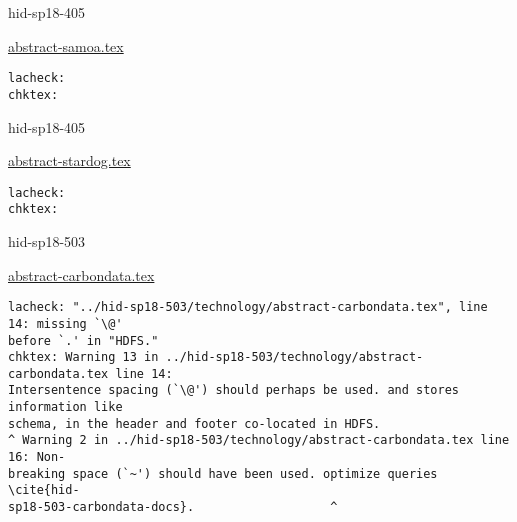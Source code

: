 \begin{IU}

hid-sp18-405

\href{https://github.com/cloudmesh-community/hid-sp18-405/blob/master//technology/abstract-samoa.tex}{abstract-samoa.tex}

\begin{tiny}
\begin{verbatim}
lacheck: 
chktex: 
\end{verbatim}
\end{tiny}
\end{IU}



\begin{IU}

hid-sp18-405

\href{https://github.com/cloudmesh-community/hid-sp18-405/blob/master//technology/abstract-stardog.tex}{abstract-stardog.tex}

\begin{tiny}
\begin{verbatim}
lacheck: 
chktex: 
\end{verbatim}
\end{tiny}
\end{IU}



\begin{IU}

hid-sp18-503

\href{https://github.com/cloudmesh-community/hid-sp18-503/blob/master//technology/abstract-carbondata.tex}{abstract-carbondata.tex}

\begin{tiny}
\begin{verbatim}
lacheck: "../hid-sp18-503/technology/abstract-carbondata.tex", line 14: missing `\@'
before `.' in "HDFS."
chktex: Warning 13 in ../hid-sp18-503/technology/abstract-carbondata.tex line 14:
Intersentence spacing (`\@') should perhaps be used. and stores information like
schema, in the header and footer co-located in HDFS.
^ Warning 2 in ../hid-sp18-503/technology/abstract-carbondata.tex line 16: Non-
breaking space (`~') should have been used. optimize queries \cite{hid-
sp18-503-carbondata-docs}.                   ^
\end{verbatim}
\end{tiny}
\end{IU}

